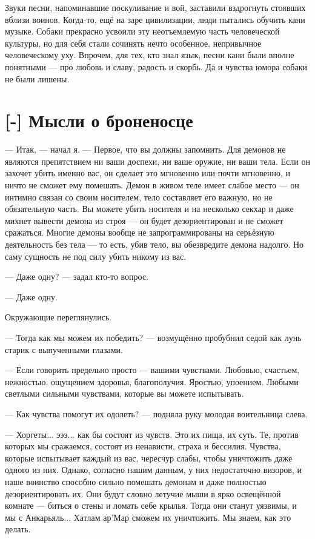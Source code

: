 Звуки песни, напоминавшие поскуливание и вой, заставили вздрогнуть стоявших вблизи воинов.
Когда-то, ещё на заре цивилизации, люди пытались обучить кани музыке.
Собаки прекрасно усвоили эту неотъемлемую часть человеческой культуры, но для себя стали сочинять нечто особенное, непривычное человеческому уху.
Впрочем, для тех, кто знал язык, песни кани были вполне понятными --- про любовь и славу, радость и скорбь.
Да и чувства юмора собаки не были лишены.

\section{[-] Мысли о броненосце}

\textspace

--- Итак, --- начал я.
--- Первое, что вы должны запомнить.
Для демонов не являются препятствием ни ваши доспехи, ни ваше оружие, ни ваши тела.
Если он захочет убить именно вас, он сделает это мгновенно или почти мгновенно, и ничто не сможет ему помешать.
Демон в живом теле имеет слабое место --- он интимно связан со своим носителем, тело составляет его важную, но не обязательную часть.
Вы можете убить носителя и на несколько секхар и даже михнет вывести демона из строя --- он будет дезориентирован и не сможет сражаться.
Многие демоны вообще не запрограммированы на серьёзную деятельность без тела --- то есть, убив тело, вы обезвредите демона надолго.
Но саму сущность не под силу убить никому из вас.

--- Даже одну? --- задал кто-то вопрос.

--- Даже одну.

Окружающие переглянулись.

--- Тогда как мы можем их победить? --- возмущённо пробубнил седой как лунь старик с выпученными глазами.

--- Если говорить предельно просто --- вашими чувствами.
Любовью, счастьем, нежностью, ощущением здоровья, благополучия.
Яростью, упоением.
Любыми светлыми сильными чувствами, которые вы можете испытывать.

--- Как чувства помогут их одолеть? --- подняла руку молодая воительница слева.

--- Хоргеты... эээ... как бы состоят из чувств.
Это их пища, их суть.
Те, против которых мы сражаемся, состоят из ненависти, страха и бессилия.
Чувства, которые испытывает каждый из вас, чересчур слабы, чтобы уничтожить даже одного из них.
Однако, согласно нашим данным, у них недостаточно визоров, и наше воинство способно сильно помешать демонам и даже полностью дезориентировать их.
Они будут словно летучие мыши в ярко освещённой комнате --- биться о стены и ломать себе крылья.
Тогда они станут уязвимы, и мы с Анкарьяль... Хатлам ар’Мар сможем их уничтожить.
Мы знаем, как это делать.

